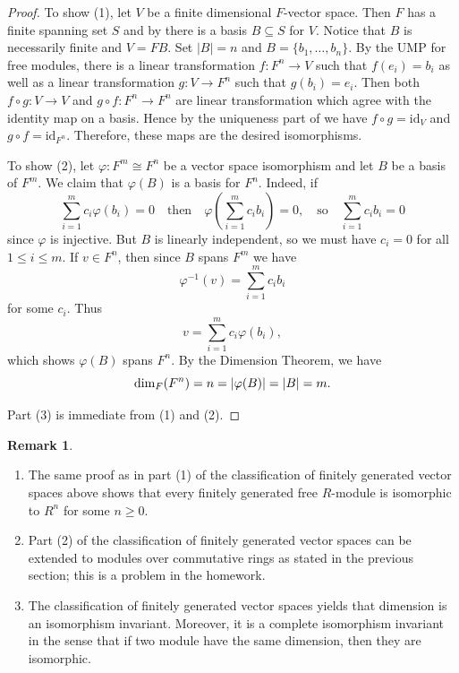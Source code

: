 \documentclass[12pt]{report}
\numberwithin{equation}{section}
\numberwithin{theorem}{chapter}
\theoremstyle{definition}
\newtheorem*{basic properties}{Basic Properties}
\newtheorem*{Important Remark}{Important Remark}
\newtheorem{remark}[theorem]{Remark}
\begin{document}
\begin{proof}
To show (1), let $V$ be a finite dimensional $F$-vector space. Then $F$ has a finite spanning set $S$ and by  there is a basis $B\subseteq S$ for $V$. Notice that $B$ is necessarily finite and $V=FB$. Set $|B|=n$ and $B=\{b_1,\ldots,b_n\}$. By the UMP for free modules, there is a linear transformation $f\!:F^n\to V$ such that $f(e_i)=b_i$ as well as a linear transformation $g\!:V\to F^n$ such that $g(b_i)=e_i$. Then both $f\circ g:V\to V$ and $g\circ f:F^n\to F^n$ are linear transformation which agree with the identity map on a basis. Hence by the uniqueness part of  we have $f\circ g=\mathrm{id}_V$ and $g\circ f=\mathrm{id}_{F^n}$. 
Therefore, these maps are the desired isomorphisms.

To show (2), let $\varphi:F^m\cong F^n$ be a vector space isomorphism and let $B$ be a basis of $F^m$.  We claim that $\varphi(B)$ is a basis for $F^n$. Indeed, if 
$$\sum_{i=1}^mc_i\varphi(b_i)=0 \quad \textrm{then} \quad \varphi \left(\sum_{i=1}^mc_ib_i \right)=0,
\quad \textrm{so} \quad \sum_{i=1}^mc_ib_i=0$$ 
since $\varphi$ is injective. But $B$ is linearly independent, so we must have $c_i=0$ for all $1 \leqslant i \leqslant m$. If $v\in F^n$, then since $B$ spans $F^m$ we have
$$\varphi^{-1}(v)=\sum_{i=1}^mc_ib_i$$
for some $c_i$. Thus 
$$v=\sum_{i=1}^mc_i\varphi(b_i),$$
which shows $\varphi(B)$ spans $F^n$.
By the Dimension Theorem, we have 
$$\dim_F(F^n)=n=|\varphi(B)|=|B|=m.\qedhere$$

Part (3) is immediate from (1) and (2).
\end{proof}


\begin{remark}
\begin{enumerate}[label=(\arabic*),itemsep=0mm]
\item The same proof as in part (1) of the classification of finitely generated vector spaces above shows that every finitely generated free $R$-module is isomorphic to $R^n$ for some $n \geqslant 0$.
\item Part (2) of the classification of finitely generated vector spaces can be extended to modules over commutative rings as stated in the previous section; this is a problem in the homework.
\item The classification of finitely generated vector spaces yields that dimension is an isomorphism invariant. Moreover, it is a complete isomorphism invariant in the sense that if two module have the same dimension, then they are isomorphic.
\end{enumerate}
\end{remark}
\end{document}
